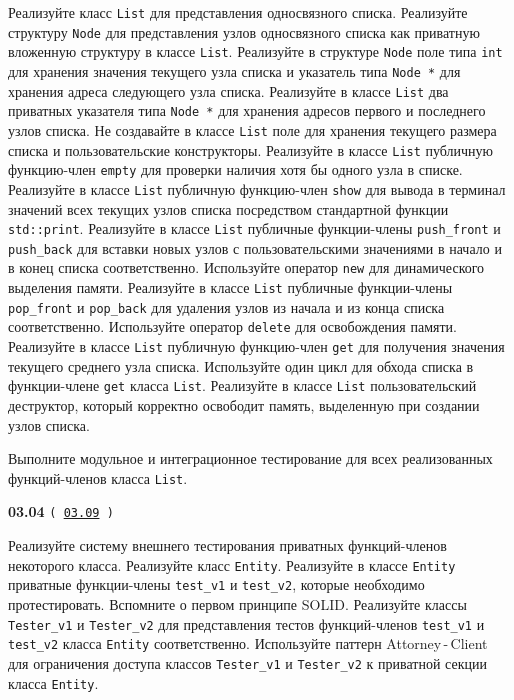 \documentclass[a4paper,12pt]{article}
\begin{document}
Реализуйте класс \lstinline{List} для представления односвязного списка. Реализуйте структуру \lstinline{Node} для представления узлов односвязного списка как приватную вложенную структуру в классе \lstinline{List}. Реализуйте в структуре \lstinline{Node} поле типа \lstinline{int} для хранения значения текущего узла списка и указатель типа \lstinline{Node *} для хранения адреса следующего узла списка. Реализуйте в классе \lstinline{List} два приватных указателя типа \lstinline{Node *} для хранения адресов первого и последнего узлов списка. Не создавайте в классе \lstinline{List} поле для хранения текущего размера списка и пользовательские конструкторы. Реализуйте в классе \lstinline{List} публичную функцию-член \lstinline{empty} для проверки наличия хотя бы одного узла в списке. Реализуйте в классе \lstinline{List} публичную функцию-член \lstinline{show} для вывода в терминал значений всех текущих узлов списка посредством стандартной функции \lstinline{std::print}. Реализуйте в классе \lstinline{List} публичные функции-члены \lstinline{push_front} и \lstinline{push_back} для вставки новых узлов с пользовательскими значениями в начало и в конец списка соответственно. Используйте оператор \lstinline{new} для динамического выделения памяти. Реализуйте в классе \lstinline{List} публичные функции-члены \lstinline{pop_front} и \lstinline{pop_back} для удаления узлов из начала и из конца списка соответственно. Используйте оператор \lstinline{delete} для освобождения памяти. Реализуйте в классе \lstinline{List} публичную функцию-член \lstinline{get} для получения значения текущего среднего узла списка. Используйте один цикл для обхода списка в функции-члене \lstinline{get} класса \lstinline{List}. Реализуйте в классе \lstinline{List} пользовательский деструктор, который корректно освободит память, выделенную при создании узлов списка. 

Выполните модульное и интеграционное тестирование для всех реализованных функций-членов класса \lstinline{List}.

\bigskip

{\large \textbf{03.04} \texttt{(\,\href{https://github.com/i-s-m-mipt/Education/blob/master/projects/examples/source/03.09.cpp}{03.09}\,)}}

\bigskip

Реализуйте систему внешнего тестирования приватных функций-членов некоторого класса. Реализуйте класс \lstinline{Entity}. Реализуйте в классе \lstinline{Entity} приватные функции-члены \lstinline{test_v1} и \lstinline{test_v2}, которые необходимо протестировать. Вспомните о первом принципе SOLID. Реализуйте классы \lstinline{Tester_v1} и \lstinline{Tester_v2} для представления тестов функций-членов \lstinline{test_v1} и \lstinline{test_v2} класса \lstinline{Entity} соответственно. Используйте паттерн Attorney\,-\,Client для ограничения доступа классов \lstinline{Tester_v1} и \lstinline{Tester_v2} к приватной секции класса \lstinline{Entity}.
\end{document}
